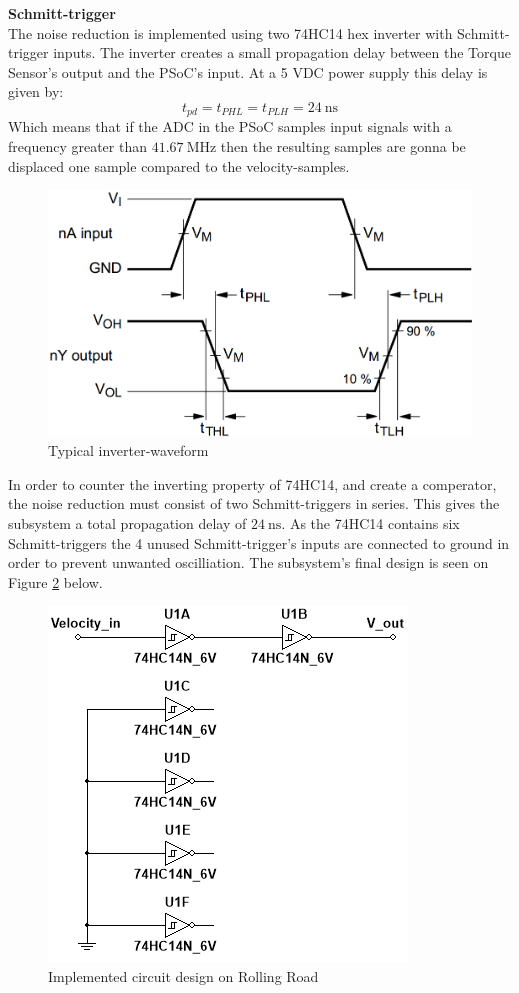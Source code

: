 \textbf{Schmitt-trigger}\\
The noise reduction is implemented using two 74HC14 hex inverter with Schmitt-trigger inputs. The inverter creates a small propagation delay between the Torque Sensor's output and the PSoC's input. At a 5 VDC power supply this delay is given by:
\begin{equation}
	t_{pd} = t_{PHL} = t_{PLH} = \SI{24}{\nano \second}
\end{equation}
Which means that if the ADC in the PSoC samples input signals with a frequency greater than $\SI{41.67}{\mega \hertz}$ then the resulting samples are gonna be displaced one sample compared to the velocity-samples.

\begin{figure}[H]
	\centering
	\includegraphics[width=0.5\linewidth]{Hardware/Pictures/74HC14_waveform}
	\caption{Typical inverter-waveform}
	\label{fig:SchmittTrigger_waveform}
\end{figure}

In order to counter the inverting property of 74HC14, and create a comperator, the noise reduction  must consist of two Schmitt-triggers in series. This gives the subsystem a total propagation delay of $\SI{24}{\nano \second}$. As the 74HC14 contains six Schmitt-triggers the 4 unused Schmitt-trigger's inputs are connected to ground in order to prevent unwanted oscilliation. The subsystem's final design is seen on Figure \ref{fig:SignalConverterVelocity} below.

\begin{figure}[H]
	\centering
	\includegraphics[width=0.5\linewidth]{Hardware/SignalConverter/VelocityDesign}
	\caption{Implemented circuit design on Rolling Road}
	\label{fig:SignalConverterVelocity}
\end{figure}

